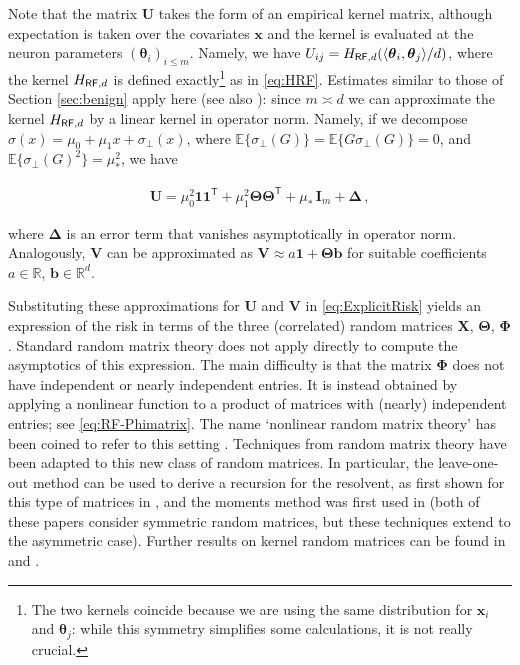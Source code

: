 Note that the matrix ${\boldsymbol U}$ takes the form of an empirical kernel matrix, although expectation is taken over the covariates
${\boldsymbol x}$ and the kernel is evaluated at the neuron parameters $({\boldsymbol \theta}_i)_{i\le m}$. Namely, we have $U_{ij}=H_{{\sf RF},d}(\langle{\boldsymbol \theta}_i,{\boldsymbol \theta}_j\rangle/d)$, where the kernel $H_{{\sf RF},d}$ is defined
exactly\footnote{The two kernels coincide because we are using the same distribution for ${\boldsymbol x}_i$ and ${\boldsymbol \theta}_j$: while this symmetry simplifies some calculations, it is not really crucial.} as in \eqref{eq:HRF}.
Estimates similar to those of Section
\ref{sec:benign} apply here (see also \cite{el2010spectrum}): since $m\asymp d$ we can approximate the kernel $H_{{\sf RF},d}$  by a linear kernel in operator norm. Namely, if we decompose $\sigma(x) = \mu_0+\mu_1 x+\sigma_{\perp}(x)$, where
$\mathbb{E}\{\sigma_{\perp}(G)\}=\mathbb{E}\{G\sigma_{\perp}(G)\}=0$,
and $\mathbb{E} \{\sigma_{\perp}(G)^2\}=\mu_*^2$, we have

\begin{align}
  {\boldsymbol U} = \mu_0^2\ensuremath{\mathbf{1}}\ensuremath{\mathbf{1}}^{{\mathsf T}}+\mu_1^2{\boldsymbol \Theta}{\boldsymbol \Theta}^{{\mathsf T}}+\mu_*\,{\mathbf I}_m+{\boldsymbol \Delta}\, ,
\end{align}

where ${\boldsymbol \Delta}$ is an error term that vanishes asymptotically in operator norm. Analogously, ${\boldsymbol V}$ can be approximated as ${\boldsymbol V}\approx a\ensuremath{\mathbf{1}}+{\boldsymbol \Theta}{\boldsymbol b}$ for suitable coefficients $a\in{\mathbb R}$, ${\boldsymbol b}\in {\mathbb R}^d$.

Substituting these approximations for ${\boldsymbol U}$ and ${\boldsymbol V}$  in \eqref{eq:ExplicitRisk} yields an expression of the risk in terms of the three (correlated) random matrices ${\boldsymbol X}$, ${\boldsymbol \Theta}$, ${\boldsymbol \Phi}$.
Standard random matrix theory does not apply directly to compute the asymptotics of this expression. The main difficulty is that the matrix ${\boldsymbol \Phi}$ does not have independent or nearly independent entries. It is instead obtained by applying a nonlinear function to a product of matrices with (nearly) independent entries; see \eqref{eq:RF-Phimatrix}. The name `nonlinear random matrix theory' has been coined to refer to this setting \cite{pennington2017nonlinear}. Techniques from random matrix theory have been adapted to this new class of random matrices. In particular, the leave-one-out method can be used to derive a recursion for the resolvent, as first shown for this type of matrices in  \cite{cheng2013spectrum}, and the moments method was first used in \cite{fan2019spectral} (both of these papers consider symmetric random matrices, but these techniques extend to the asymmetric case). Further results on kernel random matrices can be found in  \cite{do2013spectrum,louart2018random} and \cite{pennington2018spectrum}. 

